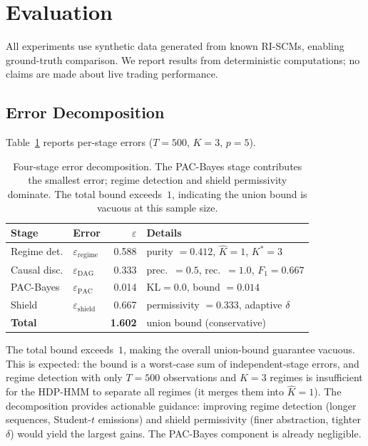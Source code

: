 \documentclass[11pt]{article}
\newcommand{\KL}{\mathrm{KL}}
\begin{document}
\section{Evaluation}\label{sec:evaluation}

All experiments use synthetic data generated from known RI-SCMs,
enabling ground-truth comparison.  We report results from deterministic
computations; no claims are made about live trading performance.

\subsection{Error Decomposition}\label{sec:errordecomp}

Table~\ref{tab:errordecomp} reports per-stage errors ($T{=}500$,
$K{=}3$, $p{=}5$).

\begin{table}[t]
\centering
\caption{Four-stage error decomposition.  The PAC-Bayes stage
contributes the smallest error; regime detection and shield
permissivity dominate.  The total bound exceeds~$1$, indicating
the union bound is vacuous at this sample
size.}\label{tab:errordecomp}
\small
\begin{tabular}{@{}llrl@{}}
\toprule
\textbf{Stage} & \textbf{Error} & $\varepsilon$
  & \textbf{Details} \\
\midrule
Regime det. & $\varepsilon_{\mathrm{regime}}$
  & 0.588 & purity $= 0.412$, $\hat{K}{=}1$,
            $K^*{=}3$ \\
Causal disc. & $\varepsilon_{\mathrm{DAG}}$
  & 0.333 & prec.\ $= 0.5$, rec.\ $= 1.0$,
            $F_1 = 0.667$ \\
PAC-Bayes & $\varepsilon_{\mathrm{PAC}}$
  & 0.014 & $\KL = 0.0$, bound $= 0.014$ \\
Shield & $\varepsilon_{\mathrm{shield}}$
  & 0.667 & permissivity $= 0.333$,
            adaptive $\delta$ \\
\midrule
\textbf{Total} & & \textbf{1.602}
  & union bound (conservative) \\
\bottomrule
\end{tabular}
\end{table}

The total bound exceeds~$1$, making the overall union-bound guarantee
vacuous.  This is expected: the bound is a worst-case sum of
independent-stage errors, and regime detection with only $T{=}500$
observations and $K{=}3$ regimes is insufficient for the HDP-HMM to
separate all regimes (it merges them into $\hat{K}{=}1$).  The
decomposition provides actionable guidance: improving regime detection
(longer sequences, Student-$t$ emissions) and shield permissivity
(finer abstraction, tighter $\delta$) would yield the largest gains.
The PAC-Bayes component is already negligible.
\end{document}
